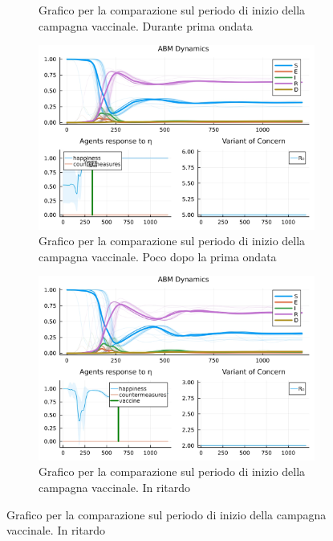 \begin{figure}[H]
\begin{subfigure}[b]{0.45\textwidth}
		\caption{Grafico per la comparazione sul periodo di inizio della campagna vaccinale. Durante prima ondata}
		\label{fig:comparison_vax_2}
	\end{subfigure}
	\hfill
	\begin{subfigure}[b]{0.45\textwidth}
		\centering
		\includegraphics[width=\textwidth]{img/SocialNetworkABM_5_V.jpg}
		\caption{Grafico per la comparazione sul periodo di inizio della campagna vaccinale. Poco dopo la prima ondata}
		\label{fig:comparison_vax_3}
	\end{subfigure}
	\hfill
	\begin{subfigure}[b]{0.45\textwidth}
		\centering
		\includegraphics[width=\textwidth]{img/SocialNetworkABM_2_V.jpg}
		\caption{Grafico per la comparazione sul periodo di inizio della campagna vaccinale. In ritardo}
		\label{fig:comparison_vax_4}
	\end{subfigure}
\end{figure}

